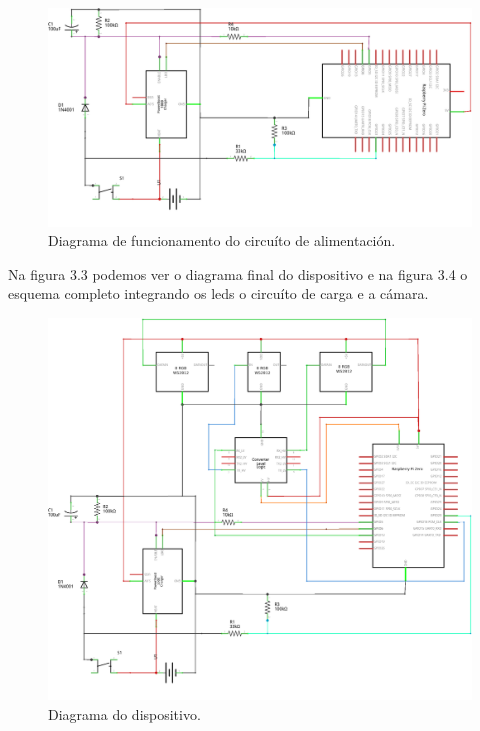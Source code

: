 \begin{itemize}
    \begin{figure}[tb]
      \centering
    	\includegraphics[scale=1]{imaxes/circuito-bateria.png}
    	\caption{Diagrama de funcionamento do circuíto de alimentación.}
    	\label{f:circuíto de alimentación}
    \end{figure}

    Na figura 3.3 podemos ver o diagrama final do dispositivo e na figura 3.4 o  esquema completo integrando os leds o circuíto de carga e a cámara.

    \begin{figure}[tb]
      \centering
    	\includegraphics[scale=1]{imaxes/circuito-completo.png}
    	\caption{Diagrama do dispositivo.}
    	\label{f:circuíto do dispositivo}
    \end{figure}


\end{itemize}
